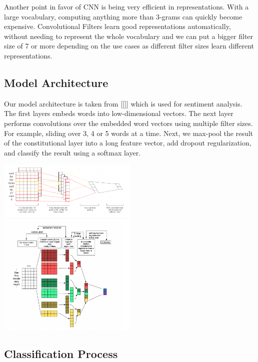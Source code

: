 \documentclass[10pt, oneside]{article}
\begin{document}
\begin{multicols}{2}
Another point in favor of CNN is being very efficient in representations.  With a large vocabulary, computing anything more than 3-grams can quickly become expensive.  Convolutional Filters learn good representations automatically, without needing to represent the whole vocabulary and we can put a bigger filter size of 7 or more depending on the use cases as different filter sizes learn different representations. 

\subsection{Model Architecture}

Our model architecture is taken from [[]] which is used for sentiment analysis. The first layers embeds words into low-dimensional vectors. The next layer performs convolutions over the embedded word vectors using multiple filter sizes. For example, sliding over 3, 4 or 5 words at a time. Next, we max-pool the result of the constitutional layer into a long feature vector, add dropout regularization, and classify the result using a softmax layer.

\includegraphics[width=0.5\textwidth]{images/cnn_architecture1.png}
\includegraphics[width=0.5\textwidth]{images/cnn_architecture2.png}

\subsection{Classification Process}


\end{multicols}
\end{document}

